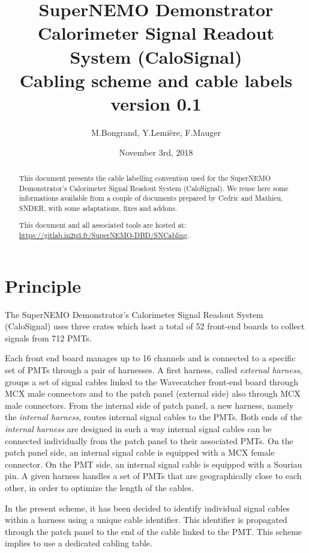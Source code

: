 \documentclass[12pt,a4paper]{article}
\title{SuperNEMO Demonstrator\\
  Calorimeter Signal Readout System (CaloSignal)\\
  Cabling scheme and cable labels\\
  version 0.1}
\author{M.Bongrand, Y.Lemi\`ere, F.Mauger}
\date{November 3rd, 2018}
\begin{document}
\maketitle

\begin{abstract}
  \noindent This document presents the cable labelling convention used
  for  the SuperNEMO  Demonstrator's Calorimeter Signal Readout  System
  (CaloSignal).  We reuse  here some informations available  from a couple
  of documents prepared  by Cedric and Mathieu, SNDER,  with some adaptations,
  fixes and addons.
  
  \vskip 10pt
  \noindent This document and all associated tools
  are hosted at:
  \vskip 5pt
  \url{https://gitlab.in2p3.fr/SuperNEMO-DBD/SNCabling}.

\end{abstract}

\tableofcontents
\vfill

\clearpage
\section{Principle}

The  SuperNEMO   Demonstrator's  Calorimeter  Signal   Readout  System
(CaloSignal)  uses three  crates which  host a  total of  52 front-end
boards to collect signals from 712 PMTs.

Each front end board  manages up to 16 channels and  is connected to a
specific set  of PMTs through a  pair of harnesses.  A  first harness,
called \emph{external harness},  groups a set of  signal cables linked
to the Wavecatcher front-end board  through MCX male connectors and to
the  patch panel  (external side)  also through  MCX male  connectors.
From  the internal side  of patch panel, a
new  harness,  namely  the \emph{internal  harness},  routes  internal
signal cables to  the PMTs.  Both ends of  the \emph{internal harness}
are designed in  such  a  way internal  signal  cables  can be  connected
individually from  the patch  panel to their  associated PMTs.  On the
patch panel  side, an  internal signal  cable is  equipped with  a MCX
female  connector.  On  the  PMT  side, an  internal  signal cable  is
equipped with  a Souriau pin.  A  given harness handles a  set of PMTs
that are geographically close to each  other, in order to optimize the
length of the cables.

In  the present  scheme, it  has been  decided to  identify individual
signal cables within a harness  using a unique cable identifier.  This
identifier is  propagated through the  patch panel  to the end  of the
cable  linked to  the PMT.   This scheme  implies to  use a  dedicated
cabling table.
\end{document}
